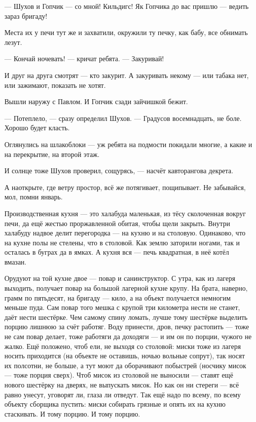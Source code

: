 --- Шухов и Гопчик --- со мной! Кильдигс! Як Гопчика до вас пришлю --- ведить зараз бригаду!

Места их у печи тут же и захватили, окружили ту печку, как бабу, все обнимать лезут.

--- Кончай ночевать! --- кричат ребята. --- Закуривай!

И друг на друга смотрят --- кто закурит. А закуривать некому --- или табака нет, или зажимают, показать не хотят.

Вышли наружу с Павлом. И Гопчик сзади зайчишкой бежит.

--- Потеплело, --- сразу определил Шухов. --- Градусов восемнадцать, не боле. Хорошо будет класть.

Оглянулись на шлакоблоки --- уж ребята на подмости покидали многие, а какие и на перекрытие, на второй этаж.

И солнце тоже Шухов проверил, сощурясь, --- насчёт кавторангова декрета.

А наоткрыте, где ветру простор, всё же потягивает, пощипывает. Не забывайся, мол, помни январь.

Производственная кухня --- это халабуда маленькая, из тёсу сколоченная вокруг печи, да ещё жестью проржавленной обитая, чтобы щели закрыть. Внутри халабуду надвое делит перегородка --- на кухню и на столовую. Одинаково, что на кухне полы не стелены, что в столовой. Как землю заторили ногами, так и осталась в буграх да в ямках. А кухня вся --- печь квадратная, в неё котёл вмазан.

Орудуют на той кухне двое --- повар и санинструктор. С утра, как из лагеря выходить, получает повар на большой лагерной кухне крупу. На брата, наверно, грамм по пятьдесят, на бригаду --- кило, а на объект получается немногим меньше пуда. Сам повар того мешка с крупой три километра нести не станет, даёт нести шестёрке. Чем самому спину ломать, лучше тому шестёрке выделить порцию лишнюю за счёт работяг. Воду принести, дров, печку растопить --- тоже не сам повар делает, тоже работяги да доходяги --- и им он по порции, чужого не жалко. Ещё положено, чтоб ели, не выходя со столовой: миски тоже из лагеря носить приходится (на объекте не оставишь, ночью вольные сопрут), так носят их полсотни, не больше, а тут моют да оборачивают побыстрей (носчику мисок --- тоже порция сверх). Чтоб мисок из столовой не выносили --- ставят ещё нового шестёрку на дверях, не выпускать мисок. Но как он ни стереги --- всё равно унесут, уговорят ли, глаза ли отведут. Так ещё надо по всему, по всему объекту сборщика пустить: миски собирать грязные и опять их на кухню стаскивать. И тому порцию. И тому порцию.

